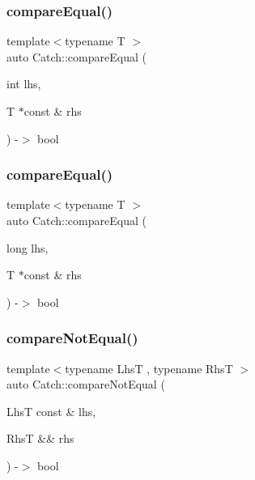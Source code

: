 \mbox{\label{namespace_catch_a6af99378569fc6f68270b6af669f1c3b}} 
\subsubsection{\texorpdfstring{compare\+Equal()}{compareEqual()}\hspace{0.1cm}{\footnotesize\ttfamily [4/5]}}
{\footnotesize\ttfamily template$<$typename T $>$ \\
auto Catch\+::compare\+Equal (\begin{DoxyParamCaption}\item[{int}]{lhs,  }\item[{T $\ast$const \&}]{rhs }\end{DoxyParamCaption}) -\/$>$ bool }

\mbox{\label{namespace_catch_a72f10ec2cad6db16029d48c8c1d9df2f}} 
\subsubsection{\texorpdfstring{compare\+Equal()}{compareEqual()}\hspace{0.1cm}{\footnotesize\ttfamily [5/5]}}
{\footnotesize\ttfamily template$<$typename T $>$ \\
auto Catch\+::compare\+Equal (\begin{DoxyParamCaption}\item[{long}]{lhs,  }\item[{T $\ast$const \&}]{rhs }\end{DoxyParamCaption}) -\/$>$ bool }

\mbox{\label{namespace_catch_a8bec217f5ef5f09c17074c311c958f3c}} 
\subsubsection{\texorpdfstring{compare\+Not\+Equal()}{compareNotEqual()}\hspace{0.1cm}{\footnotesize\ttfamily [1/5]}}
{\footnotesize\ttfamily template$<$typename LhsT , typename RhsT $>$ \\
auto Catch\+::compare\+Not\+Equal (\begin{DoxyParamCaption}\item[{LhsT const \&}]{lhs,  }\item[{RhsT \&\&}]{rhs }\end{DoxyParamCaption}) -\/$>$ bool }

